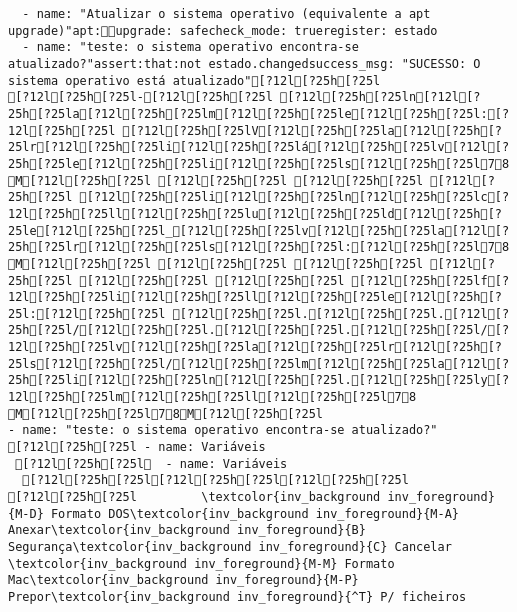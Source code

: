 \documentclass{scrartcl}
\begin{document}
\begin{Verbatim}
  - name: "Atualizar o sistema operativo (equivalente a apt upgrade)"apt:upgrade: safecheck_mode: trueregister: estado
  - name: "teste: o sistema operativo encontra-se atualizado?"assert:that:not estado.changedsuccess_msg: "SUCESSO: O sistema operativo está atualizado"[?12l[?25h[?25l
[?12l[?25h[?25l-[?12l[?25h[?25l [?12l[?25h[?25ln[?12l[?25h[?25la[?12l[?25h[?25lm[?12l[?25h[?25le[?12l[?25h[?25l:[?12l[?25h[?25l [?12l[?25h[?25lV[?12l[?25h[?25la[?12l[?25h[?25lr[?12l[?25h[?25li[?12l[?25h[?25lá[?12l[?25h[?25lv[?12l[?25h[?25le[?12l[?25h[?25li[?12l[?25h[?25ls[?12l[?25h[?25l78
M[?12l[?25h[?25l [?12l[?25h[?25l [?12l[?25h[?25l [?12l[?25h[?25l [?12l[?25h[?25li[?12l[?25h[?25ln[?12l[?25h[?25lc[?12l[?25h[?25ll[?12l[?25h[?25lu[?12l[?25h[?25ld[?12l[?25h[?25le[?12l[?25h[?25l_[?12l[?25h[?25lv[?12l[?25h[?25la[?12l[?25h[?25lr[?12l[?25h[?25ls[?12l[?25h[?25l:[?12l[?25h[?25l78
M[?12l[?25h[?25l [?12l[?25h[?25l [?12l[?25h[?25l [?12l[?25h[?25l [?12l[?25h[?25l [?12l[?25h[?25l [?12l[?25h[?25lf[?12l[?25h[?25li[?12l[?25h[?25ll[?12l[?25h[?25le[?12l[?25h[?25l:[?12l[?25h[?25l [?12l[?25h[?25l.[?12l[?25h[?25l.[?12l[?25h[?25l/[?12l[?25h[?25l.[?12l[?25h[?25l.[?12l[?25h[?25l/[?12l[?25h[?25lv[?12l[?25h[?25la[?12l[?25h[?25lr[?12l[?25h[?25ls[?12l[?25h[?25l/[?12l[?25h[?25lm[?12l[?25h[?25la[?12l[?25h[?25li[?12l[?25h[?25ln[?12l[?25h[?25l.[?12l[?25h[?25ly[?12l[?25h[?25lm[?12l[?25h[?25ll[?12l[?25h[?25l78
M[?12l[?25h[?25l78M[?12l[?25h[?25l
- name: "teste: o sistema operativo encontra-se atualizado?"
[?12l[?25h[?25l - name: Variáveis
 [?12l[?25h[?25l  - name: Variáveis
  [?12l[?25h[?25l[?12l[?25h[?25l[?12l[?25h[?25l
[?12l[?25h[?25l         \textcolor{inv_background inv_foreground}{M-D} Formato DOS\textcolor{inv_background inv_foreground}{M-A} Anexar\textcolor{inv_background inv_foreground}{B} Segurança\textcolor{inv_background inv_foreground}{C} Cancelar           \textcolor{inv_background inv_foreground}{M-M} Formato Mac\textcolor{inv_background inv_foreground}{M-P} Prepor\textcolor{inv_background inv_foreground}{^T} P/ ficheiros

\end{Verbatim}
\end{document}

